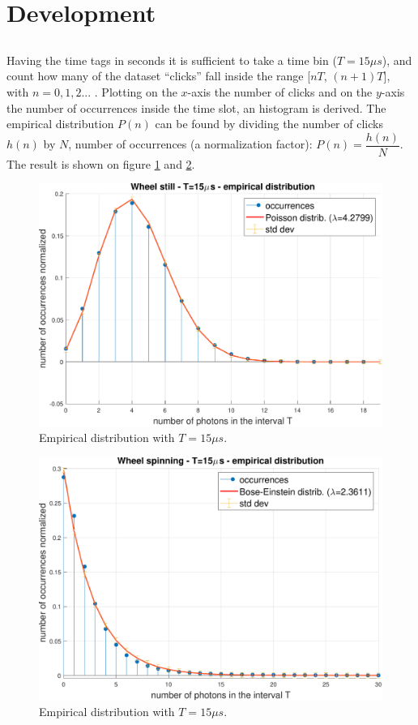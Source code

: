 
\section{Development}
\subsection{}












Having the time tags in seconds it is sufficient to take a time bin ($T=15\mu s$), and count how many of the dataset ``clicks'' fall inside the range [$nT$, $(n+1)T$], with $n=0,1,2...$ . Plotting on the $x$-axis the number of clicks and on the $y$-axis the number of occurrences inside the time slot, an histogram is derived. The empirical distribution $P(n)$ can be found by dividing the number of clicks $h(n)$ by $N$, number of occurrences (a normalization factor): $P(n)=\dfrac{h(n)}{N}$. The result is shown on figure \ref{fig:still} and \ref{fig:spinning}.
\begin{figure}[H]
    \centering
    \includegraphics[width=.9\textwidth]{images/Still_Wheel.pdf}
    \caption{Empirical distribution with $T=15\mu s$.}
    \label{fig:still}    
\end{figure}
\begin{figure}[H]
    \centering
    \includegraphics[width=.9\textwidth]{images/Spinning_Wheel.pdf}
    \caption{Empirical distribution with $T=15\mu s$.}
    \label{fig:spinning}    
\end{figure}
